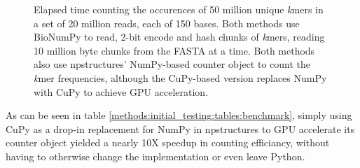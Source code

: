 \begin{figure}[H]
\hspace*{7em}
\caption{
  Elapsed time counting the occurences of 50 million unique \textit{k}mers in a set of 20 million reads, each of 150 bases.
  Both methods use BioNumPy to read, 2-bit encode and hash chunks of \textit{k}mers, reading 10 million byte chunks from the FASTA at a time.
  Both methods also use npstructures' NumPy-based counter object to count the \textit{k}mer frequencies, although the CuPy-based version replaces NumPy with CuPy to achieve GPU acceleration.
}
\label{methods:initial_testing:figures:benchmark}
\end{figure}

As can be seen in table \ref{methods:initial_testing:tables:benchmark}, simply using CuPy as a drop-in replacement for NumPy in npstructures to GPU accelerate its counter object yielded a nearly 10X speedup in counting efficiancy, without having to otherwise change the implementation or even leave Python.

